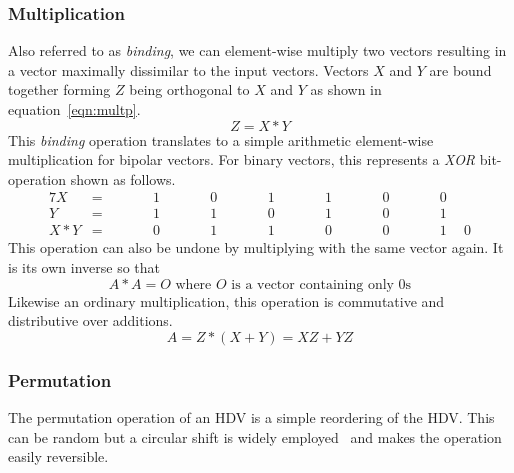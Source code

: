 \subsubsection{Multiplication} \label{sssec:mult}
Also referred to as \textit{binding}, we can element-wise multiply two vectors resulting in a vector maximally dissimilar to the input vectors. Vectors $X$ and $Y$ are bound together forming $Z$ being orthogonal to $X$ and $Y$ as shown in equation~\ref{eqn:multp}.
\begin{equation}
    \label{eqn:multp}
    Z = X * Y
\end{equation}
This \textit{binding} operation translates to a simple arithmetic element-wise multiplication for bipolar vectors. For binary vectors, this represents a \textit{XOR} bit-operation shown as follows.
\begin{alignat*}{7}
    X &= && \qquad 1 && \qquad 0 && \qquad 1 && \qquad 1 && \qquad 0 && \qquad 0 \\
    Y &= && \qquad 1 && \qquad 1 && \qquad 0 && \qquad 1 && \qquad 0 && \qquad 1 \\
    \hline
    X * Y &= && \qquad 0 && \qquad 1 && \qquad 1 &&  \qquad 0 && \qquad 0 && \qquad 1 \phantom{-}0
\end{alignat*}
This operation can also be undone by multiplying with the same vector again. It is its own inverse so that
\begin{equation}
    \label{eqn:multpinv}
    A * A = O \text{ where $O$ is a vector containing only 0s}
\end{equation}
Likewise an ordinary multiplication, this operation is commutative and distributive over additions.
\begin{equation}
    \label{eqn:multpdis}
    A = Z*(X + Y) = XZ + YZ
\end{equation}
\subsubsection{Permutation} \label{sssec:perm}
The permutation operation of an HDV is a simple reordering of the HDV. This can be random but a circular shift is widely employed~\cite{HD_rev} and makes the operation easily reversible.